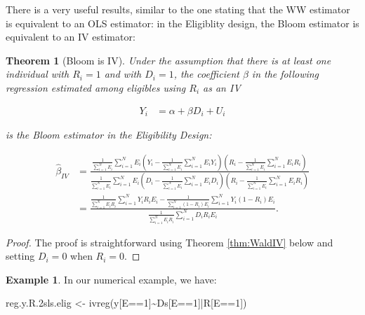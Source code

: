 \documentclass[
]{book}
\newenvironment{Shaded}{\begin{snugshade}}{\end{snugshade}}
\newcommand{\DecValTok}[1]{\textcolor[rgb]{0.00,0.00,0.81}{#1}}
\newcommand{\FloatTok}[1]{\textcolor[rgb]{0.00,0.00,0.81}{#1}}
\newcommand{\FunctionTok}[1]{\textcolor[rgb]{0.00,0.00,0.00}{#1}}
\newcommand{\NormalTok}[1]{#1}
\newcommand{\OtherTok}[1]{\textcolor[rgb]{0.56,0.35,0.01}{#1}}
\newcommand{\SpecialCharTok}[1]{\textcolor[rgb]{0.00,0.00,0.00}{#1}}
\newtheorem{theorem}{Theorem}[chapter]
\theoremstyle{definition}
\theoremstyle{definition}
\newtheorem{example}{Example}[chapter]
\theoremstyle{definition}
\theoremstyle{definition}
\theoremstyle{remark}
\begin{document}
There is a very useful results, similar to the one stating that the WW estimator is equivalent to an OLS estimator: in the Eligiblity design, the Bloom estimator is equivalent to an IV estimator:

\begin{theorem}[Bloom is IV]
\protect\hypertarget{thm:BloomIV}{}{\label{thm:BloomIV} \iffalse (Bloom is IV) \fi{} }Under the assumption that there is at least one individual with \(R_i=1\) and with \(D_i=1\), the coefficient \(\beta\) in the following regression estimated among eligibles using \(R_i\) as an IV

\begin{align*}
        Y_i &  = \alpha + \beta D_i + U_i
    \end{align*}

is the Bloom estimator in the Eligibility Design:

\begin{align*}
\hat{\beta}_{IV} & = \frac{\frac{1}{\sum_{i=1}^N E_i}\sum_{i=1}^NE_i\left(Y_i-\frac{1}{\sum_{i=1}^N E_i}\sum_{i=1}^NE_iY_i\right)\left(R_i-\frac{1}{\sum_{i=1}^N E_i}\sum_{i=1}^NE_iR_i\right)}{\frac{1}{\sum_{i=1}^N E_i}\sum_{i=1}^NE_i\left(D_i-\frac{1}{\sum_{i=1}^N E_i}\sum_{i=1}^NE_iD_i\right)\left(R_i-\frac{1}{\sum_{i=1}^N E_i}\sum_{i=1}^NE_iR_i\right)} \\
                                & = \frac{\frac{1}{\sum_{i=1}^N E_iR_i}\sum_{i=1}^N Y_iR_iE_i-\frac{1}{\sum_{i=1}^N (1-R_i)E_i}\sum_{i=1}^N Y_i(1-R_i)E_i}{\frac{1}{\sum_{i=1}^N E_iR_i}\sum_{i=1}^N D_iR_iE_i}.
\end{align*}
\end{theorem}

\begin{proof}
\iffalse{} {Proof. } \fi{}The proof is straightforward using Theorem \ref{thm:WaldIV} below and setting \(D_i=0\) when \(R_i=0\).
\end{proof}

\begin{example}
\protect\hypertarget{exm:unnamed-chunk-99}{}{\label{exm:unnamed-chunk-99} }In our numerical example, we have:
\end{example}

\begin{Shaded}
\begin{Highlighting}[]
\NormalTok{reg.y.R}\FloatTok{.2}\NormalTok{sls.elig }\OtherTok{\textless{}{-}} \FunctionTok{ivreg}\NormalTok{(y[E}\SpecialCharTok{==}\DecValTok{1}\NormalTok{]}\SpecialCharTok{\textasciitilde{}}\NormalTok{Ds[E}\SpecialCharTok{==}\DecValTok{1}\NormalTok{]}\SpecialCharTok{|}\NormalTok{R[E}\SpecialCharTok{==}\DecValTok{1}\NormalTok{])}
\end{Highlighting}
\end{Shaded}
\end{document}
